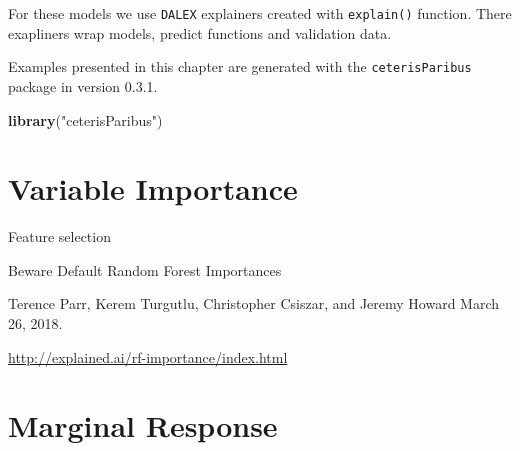 \documentclass[]{book}
\newenvironment{Shaded}{\begin{snugshade}}{\end{snugshade}}
\newcommand{\DataTypeTok}[1]{\textcolor[rgb]{0.13,0.29,0.53}{#1}}
\newcommand{\DecValTok}[1]{\textcolor[rgb]{0.00,0.00,0.81}{#1}}
\newcommand{\KeywordTok}[1]{\textcolor[rgb]{0.13,0.29,0.53}{\textbf{#1}}}
\newcommand{\NormalTok}[1]{#1}
\newcommand{\OperatorTok}[1]{\textcolor[rgb]{0.81,0.36,0.00}{\textbf{#1}}}
\newcommand{\StringTok}[1]{\textcolor[rgb]{0.31,0.60,0.02}{#1}}
\theoremstyle{definition}
\theoremstyle{definition}
\theoremstyle{definition}
\theoremstyle{remark}
\begin{document}
For these models we use \texttt{DALEX} explainers created with
\texttt{explain()} function. There exapliners wrap models, predict
functions and validation data.

\begin{Shaded}
\end{Shaded}

Examples presented in this chapter are generated with the
\texttt{ceterisParibus} package in version 0.3.1.

\begin{Shaded}
\begin{Highlighting}[]
\KeywordTok{library}\NormalTok{(}\StringTok{"ceterisParibus"}\NormalTok{)}
\end{Highlighting}
\end{Shaded}

\hypertarget{variable-importance}{%
\chapter{Variable Importance}\label{variable-importance}}

Feature selection

Beware Default Random Forest Importances

Terence Parr, Kerem Turgutlu, Christopher Csiszar, and Jeremy Howard
March 26, 2018.

\url{http://explained.ai/rf-importance/index.html}

\hypertarget{marginal-response}{%
\chapter{Marginal Response}\label{marginal-response}}
\end{document}
